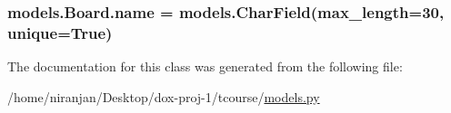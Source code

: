 \subsubsection[{\texorpdfstring{name}{name}}]{\setlength{\rightskip}{0pt plus 5cm}models.\+Board.\+name = models.\+Char\+Field(max\+\_\+length=30, unique=True)\hspace{0.3cm}{\ttfamily [static]}}\hypertarget{classmodels_1_1_board_aa7fad256715594eb7d0b1bcb52966340}{}\label{classmodels_1_1_board_aa7fad256715594eb7d0b1bcb52966340}


The documentation for this class was generated from the following file\+:\begin{DoxyCompactItemize}
\item 
/home/niranjan/\+Desktop/dox-\/proj-\/1/tcourse/\hyperlink{models_8py}{models.\+py}\end{DoxyCompactItemize}
